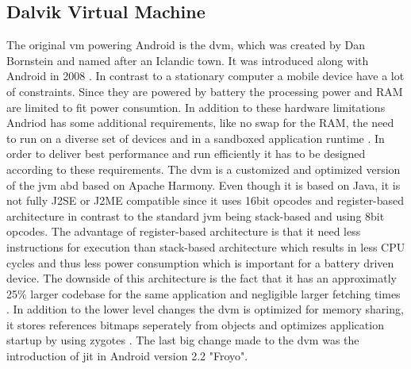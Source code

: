 \subsection{Dalvik Virtual Machine} \label{subsection:android-dalvik}
The original \gls{vm} powering Android is the \gls{dvm}, which was created by Dan Bornstein and named after an Iclandic town. It was introduced along with Android in 2008 \cite{developersRelease}.
\newline
In contrast to a stationary computer a mobile device have a lot of constraints.
Since they are powered by battery the processing power and RAM are limited to fit power consumtion.
In addition to these hardware limitations Andriod has some additional requirements, like no swap for the RAM, the need to run on a diverse set of devices and in a sandboxed application runtime .
In order to deliver best performance and run efficiently it has to be designed according to these requirements.
The \gls{dvm} is a customized and optimized version of the \gls{jvm} abd based on Apache Harmony.
Even though it is based on Java, it is not fully J2SE or J2ME compatible since it uses 16bit opcodes and register-based architecture in contrast to the standard \gls{jvm} being stack-based and using 8bit opcodes.
The advantage of register-based architecture is that it need less instructions for execution than stack-based architecture which results in less CPU cycles and thus less power consumption which is important for a battery driven device.
The downside of this architecture is the fact that it has an approximatly 25\% larger codebase for the same application and negligible larger fetching times \cite{ehringerDalvik}.
In addition to the lower level changes the \gls{dvm} is optimized for memory sharing, it stores references bitmaps seperately from objects and optimizes application startup by using zygotes \cite{andevconDalvikART}.
\newline
The last big change made to the \gls{dvm} was the introduction of \gls{jit} in Android version 2.2 "Froyo".
